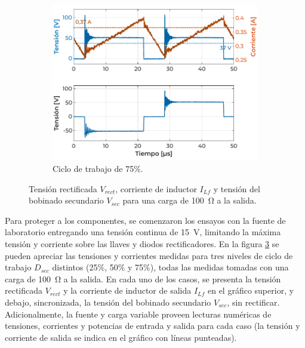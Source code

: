 \begin{figure}[h]
\begin{subfigure}{0.48\textwidth}
        \label{fig:ensayo_concarga15V_DC50}
    \end{subfigure}
    \hfill\vspace{1em}
    \begin{subfigure}{0.48\textwidth}
        \centering
        \includegraphics[width=\textwidth]{Imagenes/Con Carga - Caso 5.pdf}
        \caption{Ciclo de trabajo de 75\%.}
        \label{fig:ensayo_concarga15V_DC75}
    \end{subfigure}
    \caption{Tensión rectificada $V_{rect}$, corriente de inductor $I_{Lf}$ y tensión del bobinado secundario $V_{sec}$ para una carga de \SI[]{100}{\ohm} a la salida.}
    \label{fig:ensayo_concarga15V}
\end{figure}

\newpage

Para proteger a los componentes, se comenzaron los ensayos con la fuente de laboratorio entregando una tensión continua de \SI[]{15}{\volt}, limitando la máxima tensión y corriente sobre las llaves y diodos rectificadores. En la figura \ref{fig:ensayo_concarga15V} se pueden apreciar las tensiones y corrientes medidas para tres niveles de ciclo de trabajo $D_{sec}$ distintos (25\%, 50\% y 75\%), todas las medidas tomadas con una carga de \SI[]{100}{\ohm} a la salida. En cada uno de los casos, se presenta la tensión rectificada $V_{rect}$ y la corriente de inductor de salida $I_{Lf}$ en el gráfico superior, y debajo, sincronizada, la tensión del bobinado secundario $V_{sec}$, sin rectificar. Adicionalmente, la fuente y carga variable proveen lecturas numéricas de tensiones, corrientes y potencias de entrada y salida para cada caso (la tensión y corriente de salida se indica en el gráfico con líneas punteadas).\\


